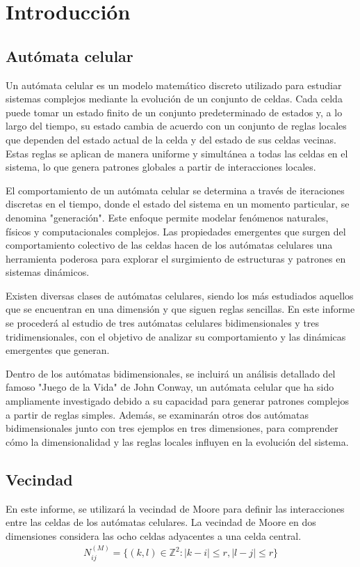 \section{Introducción}
\label{sec:intro}

\subsection{Autómata celular}
\label{subsec:ac}

Un autómata celular es un modelo matemático discreto utilizado para estudiar sistemas complejos mediante la evolución de un conjunto de celdas.
Cada celda puede tomar un estado finito de un conjunto predeterminado de estados y, a lo largo del tiempo, su estado cambia de acuerdo con un conjunto de reglas locales que dependen del estado actual de la celda y del estado de sus celdas vecinas.
Estas reglas se aplican de manera uniforme y simultánea a todas las celdas en el sistema, lo que genera patrones globales a partir de interacciones locales.

El comportamiento de un autómata celular se determina a través de iteraciones discretas en el tiempo, donde el estado del sistema en un momento particular, se denomina "generación".
Este enfoque permite modelar fenómenos naturales, físicos y computacionales complejos.
Las propiedades emergentes que surgen del comportamiento colectivo de las celdas hacen de los autómatas celulares una herramienta poderosa para explorar el surgimiento de estructuras y patrones en sistemas dinámicos.

Existen diversas clases de autómatas celulares, siendo los más estudiados aquellos que se encuentran en una dimensión y que siguen reglas sencillas.
En este informe se procederá al estudio de tres autómatas celulares bidimensionales y tres tridimensionales, con el objetivo de analizar su comportamiento y las dinámicas emergentes que generan.

Dentro de los autómatas bidimensionales, se incluirá un análisis detallado del famoso "Juego de la Vida" de John Conway, un autómata celular que ha sido ampliamente investigado debido a su capacidad para generar patrones complejos a partir de reglas simples.
Además, se examinarán otros dos autómatas bidimensionales junto con tres ejemplos en tres dimensiones, para comprender cómo la dimensionalidad y las reglas locales influyen en la evolución del sistema.

\subsection{Vecindad}
\label{subsec:vecindad}
En este informe, se utilizará la vecindad de Moore para definir las interacciones entre las celdas de los autómatas celulares.
La vecindad de Moore en dos dimensiones considera las ocho celdas adyacentes a una celda central.
\begin{equation}
    \label{eq:moore_neighborhood}
    \begin{aligned}
        N^{(M)}_{ij} = \{(k,l) \in \mathbb{Z}^2 : |k-i| \leq r, |l-j| \leq r\}
    \end{aligned}
\end{equation}

